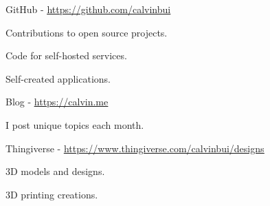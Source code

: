 

\begin{cventries}

  \cventry
  {} %
  {GitHub - \underline{\href{https://github.com/calvinbui}{https://github.com/calvinbui}}} %
  {} %
  {} %
  {
    \begin{cvitems} %
      \item {Contributions to open source projects.}
      \item {Code for self-hosted services.}
      \item {Self-created applications.}
    \end{cvitems}
  }

  \cventry
  {} %
  {Blog - \underline{\href{https://calvin.me}{https://calvin.me}}} %
  {} %
  {} %
  {
    \begin{cvitems} %
      \item {I post unique topics each month.}
    \end{cvitems}
  }

  \cventry
  {} %
  {Thingiverse - \underline{\href{https://www.thingiverse.com/calvinbui/designs}{https://www.thingiverse.com/calvinbui/designs}}} %
  {} %
  {} %
  {
    \begin{cvitems} %
      \item {3D models and designs.}
      \item {3D printing creations.}
    \end{cvitems}
  }

\end{cventries}
